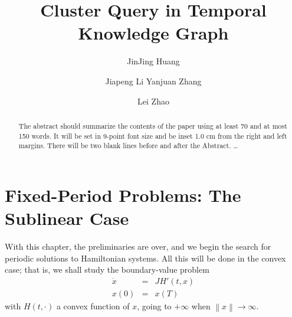 \documentclass{llncs}
\begin{document}
    \frontmatter          %
    \pagestyle{headings}  %
    \title{ Cluster Query in Temporal Knowledge Graph}
    \author{JinJing Huang \and Jiapeng Li
    Yanjuan Zhang \and Lei Zhao}
    
    \maketitle              %
    
    
    \begin{abstract}
    The abstract should summarize the contents of the paper
    using at least 70 and at most 150 words. It will be set in 9-point
    font size and be inset 1.0 cm from the right and left margins.
    There will be two blank lines before and after the Abstract. \dots
    \end{abstract}

    

    \section{Fixed-Period Problems: The Sublinear Case}
    With this chapter, the preliminaries are over, and we begin the search
    for periodic solutions to Hamiltonian systems. All this will be done in
    the convex case; that is, we shall study the boundary-value problem
    \begin{eqnarray*}
      \dot{x}&=&JH' (t,x)\\
      x(0) &=& x(T)
    \end{eqnarray*}
    with $H(t,\cdot)$ a convex function of $x$, going to $+\infty$ when
    $\left\|x\right\| \to \infty$.
    
\end{document}

